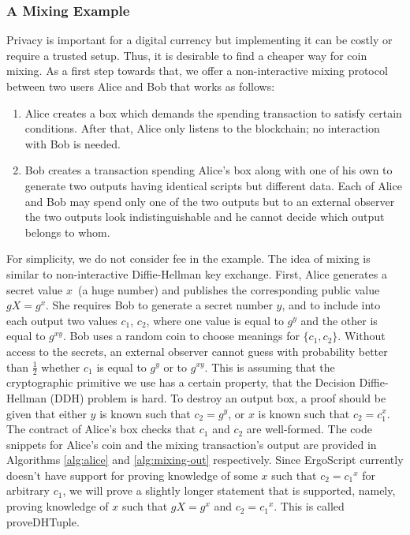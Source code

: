 \subsubsection{A Mixing Example}
 \label{sec:platform}

 Privacy is important for a digital currency but implementing it can be costly or require a trusted setup. Thus, it is desirable to find a cheaper way for coin mixing. As a first step towards that, we offer a non-interactive mixing protocol between two users Alice and Bob that works as follows:
 \begin{enumerate}
    \item{} Alice creates a box which demands the spending transaction to satisfy certain conditions. After that, Alice only listens to the blockchain; no interaction with Bob is needed.
    \item{} Bob creates a transaction spending Alice's box along with one of his own to generate two outputs having identical scripts but different data. Each of Alice and Bob may spend only one of the two outputs but to an external observer the two outputs look indistinguishable and he cannot decide which output belongs to whom.
 \end{enumerate}

 For simplicity, we do not consider fee in the example. The idea of mixing is similar to non-interactive Diffie-Hellman key exchange. First, Alice generates a secret value $x$~(a huge number) and publishes the corresponding public value $gX = g^x$. She requires Bob to generate a secret number $y$, and to include into each output two
 values $c_1$, $c_2$, where one value is equal to $g^y$ and the other is equal to $g^{xy}$. Bob uses a random coin to choose meanings for $\{c_1, c_2\}$. Without access to the secrets, an external observer cannot guess with probability better than  $\frac{1}{2}$ whether $c_1$ is equal to $g^y$ or to $g^{xy}$. This is assuming that the cryptographic primitive we use has a certain property, that the Decision Diffie-Hellman (DDH) problem is hard. To destroy an output box, a proof should be given that either $y$ is known such that $c_2 = g^y$, or $x$ is known such that $c_2 = c_1^x$.
 The contract of Alice's box checks that $c_1$ and $c_2$ are well-formed. The code snippets for Alice's coin and the mixing transaction's output are provided in Algorithms \ref{alg:alice} and \ref{alg:mixing-out} respectively. Since ErgoScript currently doesn't have support for proving knowledge of some $x$ such that $c_2 = {c_1}^x$ for arbitrary $c_1$,  we will prove a slightly longer statement that is supported, namely, proving knowledge of $x$ such that $gX = g^x$ and $c_2 = {c_1}^x$. This is called proveDHTuple.

